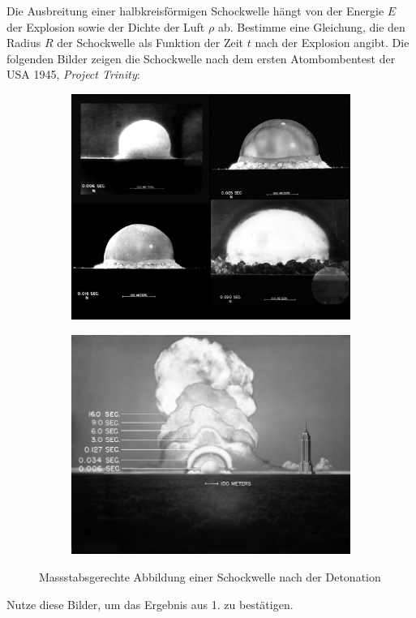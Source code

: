 \begin{Exercise}[label = trinity, origin = Aaron Wild, title = {Project Trinity}, difficulty = 3]
	Die Ausbreitung einer halbkreisförmigen Schockwelle hängt von der Energie $E$ der Explosion sowie der Dichte der Luft $\rho$ ab.
	\Question Bestimme eine Gleichung, die den Radius $R$ der Schockwelle als Funktion der Zeit $t$ nach der Explosion angibt.
	\ExeText Die folgenden Bilder zeigen die Schockwelle nach dem ersten Atombombentest der USA 1945, \textit{Project Trinity}:
		\begin{figure}[h]
		\begin{subfigure}[b]{0.5\textwidth}
			\centering
			\includegraphics[scale = 0.25]{../tasks/selfmade/trinityim.png}
		\end{subfigure}
		\begin{subfigure}[b]{0.5\textwidth}
			\centering
			\includegraphics[scale = 0.25]{../tasks/selfmade/trinityim2.png}
		\end{subfigure}
		\caption{Massstabsgerechte Abbildung einer Schockwelle nach der Detonation}
		\label{fig:trinityim}
		\end{figure}
	\Question Nutze diese Bilder, um das Ergebnis aus 1. zu bestätigen.
\end{Exercise}
